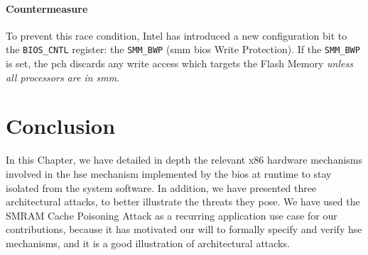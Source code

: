 \paragraph{Countermeasure}
%
To prevent this race condition, Intel has introduced a new configuration bit to
the \texttt{BIOS\_CNTL} register: the \texttt{SMM\_BWP} (\ac{smm} \ac{bios}
Write Protection).
%
If the \texttt{SMM\_BWP} is set, the \ac{pch} discards any write access which
targets the Flash Memory \emph{unless all processors are in \ac{smm}}.

\section{Conclusion}
\label{sec:usecase:conclusion}

In this Chapter, we have detailed in depth the relevant x86 hardware mechanisms
involved in the \ac{hse} mechanism implemented by the \ac{bios} at runtime to
stay isolated from the system software.
%
In addition, we have presented three architectural attacks, to better illustrate
the threats they pose.
%
We have used the SMRAM Cache Poisoning Attack as a recurring application use
case for our contributions, because it has motivated our will to formally
specify and verify \ac{hse} mechanisms, and it is a good illustration of
architectural attacks.
